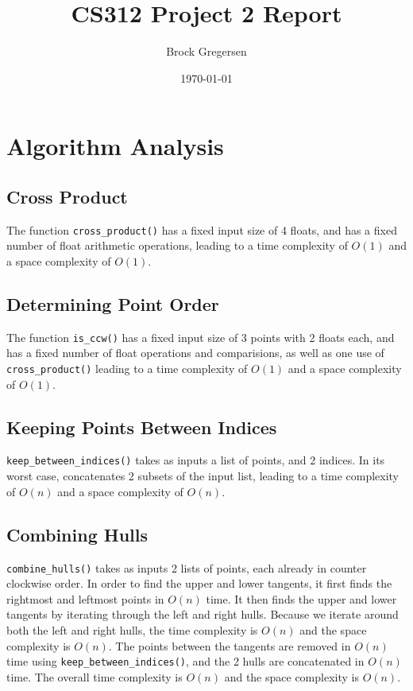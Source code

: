 \documentclass[12pt]{article}
\title{CS312 Project 2 Report}
\author{Brock Gregersen}
\date{\today}
\begin{document}
\maketitle
\tableofcontents %

\newpage

\section{Algorithm Analysis}

\subsection{Cross Product}
The function \texttt{cross\_product()} has a fixed input size of 4 
floats, and has a fixed number of float arithmetic operations, leading to a
time complexity of $O(1)$ and a space complexity of $O(1)$.

\subsection{Determining Point Order}
The function \texttt{is\_ccw()} has a fixed input size of 3 points
with 2 floats each, and has a fixed number of float operations and
comparisions, as well as one use of \texttt{cross\_product()}
leading to a time complexity of $O(1)$ and a space complexity of $O(1)$.

\subsection{Keeping Points Between Indices}
\texttt{keep\_between\_indices()} takes as inputs a list of points,
and 2 indices. In its worst case, concatenates 2 subsets of the
input list, leading to a time complexity of $O(n)$ and a space
complexity of $O(n)$.

\subsection{Combining Hulls}
\texttt{combine\_hulls()} takes as inputs 2 lists of points, each 
already in counter clockwise order. In order to find the upper and
lower tangents, it first finds the rightmost and leftmost points
in $O(n)$ time. It then finds the upper and lower tangents by iterating
through the left and right hulls. Because we iterate around both the left
and right hulls, the time complexity is $O(n)$ and the space complexity
is $O(n)$. The points between the tangents are removed in $O(n)$ time
using \texttt{keep\_between\_indices()}, and the 2 hulls are concatenated
in $O(n)$ time. The overall time complexity is $O(n)$ and the space
complexity is $O(n)$.
\end{document}
